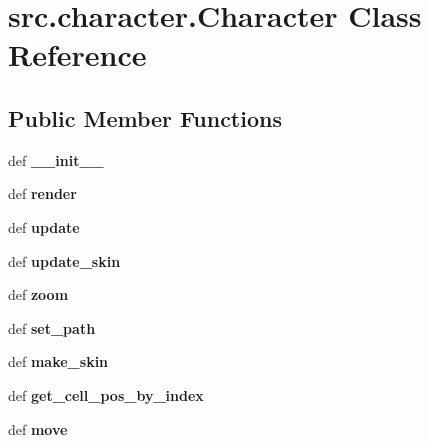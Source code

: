 \hypertarget{classsrc_1_1character_1_1_character}{\section{src.\-character.\-Character \-Class \-Reference}
\label{classsrc_1_1character_1_1_character}
}
\subsection*{\-Public \-Member \-Functions}
\begin{DoxyCompactItemize}
\item 
\hypertarget{classsrc_1_1character_1_1_character_a8d23c8f9bc08acd9f50833b99442d2db}{def {\bfseries \-\_\-\-\_\-init\-\_\-\-\_\-}}\label{classsrc_1_1character_1_1_character_a8d23c8f9bc08acd9f50833b99442d2db}

\item 
\hypertarget{classsrc_1_1character_1_1_character_ab245b38ae250a89596fa64e35ba994de}{def {\bfseries render}}\label{classsrc_1_1character_1_1_character_ab245b38ae250a89596fa64e35ba994de}

\item 
\hypertarget{classsrc_1_1character_1_1_character_a38b28a32b53121efaf406d63b9aeb553}{def {\bfseries update}}\label{classsrc_1_1character_1_1_character_a38b28a32b53121efaf406d63b9aeb553}

\item 
\hypertarget{classsrc_1_1character_1_1_character_a08f530ce06eaa3e98893e6187f0d55ff}{def {\bfseries update\-\_\-skin}}\label{classsrc_1_1character_1_1_character_a08f530ce06eaa3e98893e6187f0d55ff}

\item 
\hypertarget{classsrc_1_1character_1_1_character_a42527c58b6594bf86eead5da4d7db7ea}{def {\bfseries zoom}}\label{classsrc_1_1character_1_1_character_a42527c58b6594bf86eead5da4d7db7ea}

\item 
\hypertarget{classsrc_1_1character_1_1_character_a3adec53ea20268070e68f86e1e1ad16d}{def {\bfseries set\-\_\-path}}\label{classsrc_1_1character_1_1_character_a3adec53ea20268070e68f86e1e1ad16d}

\item 
\hypertarget{classsrc_1_1character_1_1_character_aeb893b6369a22260495c4f6c9e7d9456}{def {\bfseries make\-\_\-skin}}\label{classsrc_1_1character_1_1_character_aeb893b6369a22260495c4f6c9e7d9456}

\item 
\hypertarget{classsrc_1_1character_1_1_character_aef87974d3f913d87c34d8eefcf0dd584}{def {\bfseries get\-\_\-cell\-\_\-pos\-\_\-by\-\_\-index}}\label{classsrc_1_1character_1_1_character_aef87974d3f913d87c34d8eefcf0dd584}

\item 
\hypertarget{classsrc_1_1character_1_1_character_a6bdbe8c4ea3b6c68b6a79944ae0a7648}{def {\bfseries move}}\label{classsrc_1_1character_1_1_character_a6bdbe8c4ea3b6c68b6a79944ae0a7648}

\end{DoxyCompactItemize}
